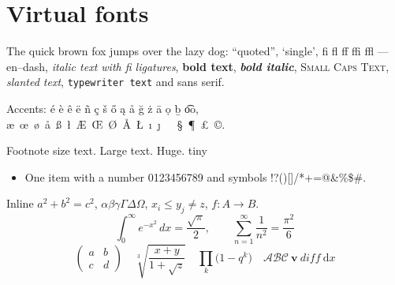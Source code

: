 \documentclass{article}\usepackage[T1]{fontenc}\usepackage[sc]{mathpazo}
\begin{document}
\section{Virtual fonts}
The quick brown fox jumps over the lazy dog: ``quoted'', `single', fi fl ff ffi ffl --- en--dash,
\textit{italic text with fi ligatures}, \textbf{bold text}, \textbf{\textit{bold italic}},
\textsc{Small Caps Text}, \textsl{slanted text}, \texttt{typewriter text} and \textsf{sans serif}.

Accents: \'e \`e \^e \"e \~n \c{c} \v{s} \H{o} \k{a} \r{a} \u{g} \.z \=a \d{o} \b{b} \t{oo},
\ae\ \oe\ \o\ \aa\ \ss\ \l\ \AE\ \OE\ \O\ \AA\ \L\ \i\ \j\ \dag\ \ddag\ \S\ \P\ \pounds\ \copyright.

{\footnotesize Footnote size text.} {\Large Large text.} {\Huge Huge.} {\tiny tiny}

\begin{itemize}\item One item with a number 0123456789 and symbols !?()[]/*+=@\&\%\$\#.\end{itemize}

Inline $a^2+b^2=c^2$, $\alpha\beta\gamma\Gamma\Delta\Omega$, $x_i \le y_j \ne z$, $f\colon A\to B$.
\[ \int_0^\infty e^{-x^2}\,dx = \frac{\sqrt{\pi}}{2}, \qquad \sum_{n=1}^{\infty}\frac{1}{n^2}=\frac{\pi^2}{6} \]
\[ \left(\begin{array}{cc} a & b\\ c & d\end{array}\right)\quad \sqrt[3]{\frac{x+y}{1+\sqrt{z}}}\quad \prod_{k}\bigl(1-q^k\bigr) \quad \mathcal{ABC}\ \mathbf{v}\ \mathit{diff}\ \mathrm{d}x \]
\end{document}
